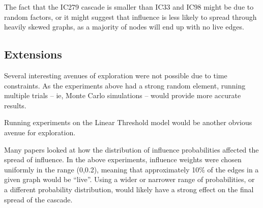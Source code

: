The fact that the IC279 cascade is smaller than IC33 and IC98 might be due to random factors, or it might suggest that influence is less likely to spread through heavily skewed graphs, as a majority of nodes will end up with no live edges.

\subsection{Extensions}

Several interesting avenues of exploration were not possible due to time constraints. 
As the experiments above had a strong random element, running multiple trials -- ie, Monte Carlo simulations -- would provide more accurate results.

Running experiments on the Linear Threshold model would be another obvious avenue for exploration.

Many papers looked at how the distribution of influence probabilities affected the spread of influence. In the above experiments, influence weights were chosen uniformly in the range (0,0.2), meaning that approximately 10\% of the edges in a given graph would be ``live''. Using a wider or narrower range of probabilities, or a different probability distribution, would likely have a strong effect on the final spread of the cascade.


